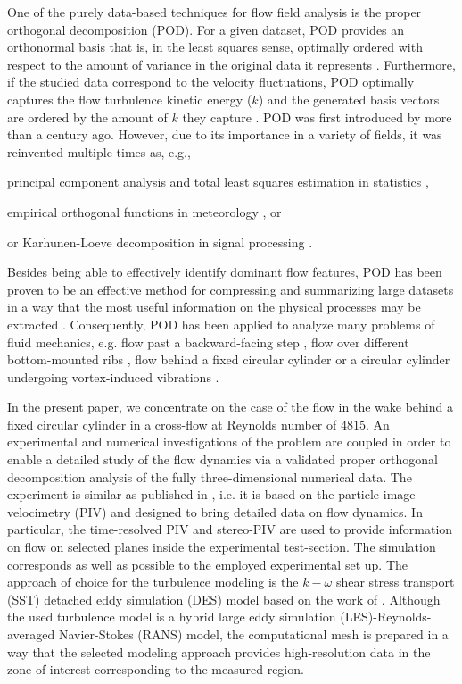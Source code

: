 One of the purely data-based techniques for flow field analysis is the proper orthogonal decomposition (POD). For a given dataset, POD provides an orthonormal basis that is, in the least squares sense, optimally ordered with respect to the amount of variance in the original data it represents \citep{isoz2019}. Furthermore, if the studied data correspond to the velocity fluctuations, POD optimally captures the flow turbulence kinetic energy ($k$) and the generated basis vectors are ordered by the amount of $k$ they capture \citep{taira2020}. POD was first introduced by \citet{Pearson1901} more than a century ago. However, due to its importance in a variety of fields, it was reinvented multiple times as, e.g., 
\begin{inparaenum}[(i)]
        \item principal component analysis \citep{hoetelling1935,jollife2014} and total least squares estimation in statistics \citep{vanHuffel2013,schaffrin2006,leyang2012},
        \item empirical orthogonal functions in meteorology \citep{lorenzxy}, or
        \item or Karhunen-Loeve decomposition in signal processing \citep{karhunen1946,loeve1946}. 
\end{inparaenum}

Besides being able to effectively identify dominant flow features, POD has been proven to be an effective method for compressing and summarizing large datasets in a way that the most useful information on the physical processes may be extracted \citep{kostas2005,feng2010}. Consequently, POD has been applied to analyze many problems of fluid mechanics, e.g. flow past a backward-facing step \citep{kostas2005,kostas2002}, flow over different bottom-mounted ribs \citep{fraga2021}, flow behind a fixed circular cylinder \citep{venturi2006,ma2000,ma2003,feng2010} or a circular cylinder undergoing vortex-induced vibrations \citep{riches2018}.

In the present paper, we concentrate on the case of the flow in the wake behind a {fixed} circular cylinder in a cross-flow at Reynolds number of $4815$. An experimental and numerical investigations of the problem are coupled in order to enable a detailed study of the flow dynamics via a validated proper orthogonal decomposition analysis of the fully three-dimensional numerical data. The experiment is similar as published in \citep{uruba2020,uruba2020a}, i.e. it is based on the particle image velocimetry (PIV) and designed to bring detailed data on flow dynamics. In particular, the time-resolved PIV and stereo-PIV are used to provide information on flow on selected planes inside the experimental test-section. The simulation corresponds as well as possible to the employed experimental set up. The approach of choice for the turbulence modeling is the $k-\omega$ shear stress transport (SST) detached eddy simulation (DES) model based on the work {of} \citet{strelets2001}. Although the used turbulence model is a hybrid large eddy simulation (LES)-Reynolds-averaged Navier-Stokes (RANS) model, the computational mesh is prepared in a way that the selected modeling approach provides high-resolution data in the zone of interest corresponding to the measured region.

